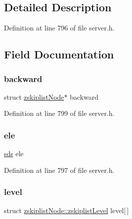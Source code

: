 \subsection{Detailed Description}


Definition at line 796 of file server.\+h.



\subsection{Field Documentation}
\mbox{\label{structzskiplist_node_a060155bb4ea50dabba713eac3451d80e}} 
\subsubsection{\texorpdfstring{backward}{backward}}
{\footnotesize\ttfamily struct \hyperlink{structzskiplist_node}{zskiplist\+Node}$\ast$ backward}



Definition at line 799 of file server.\+h.

\mbox{\label{structzskiplist_node_ac99cd495189c228ff8d538f04489805e}} 
\subsubsection{\texorpdfstring{ele}{ele}}
{\footnotesize\ttfamily \hyperlink{sds_8h_ad69abac3df4532879db9642c95f5ef6f}{sds} ele}



Definition at line 797 of file server.\+h.

\mbox{\label{structzskiplist_node_ab6e002b167ff0de655b16debe293180c}} 
\subsubsection{\texorpdfstring{level}{level}}
{\footnotesize\ttfamily struct \hyperlink{structzskiplist_node_1_1zskiplist_level}{zskiplist\+Node\+::zskiplist\+Level}  level\mbox{[}$\,$\mbox{]}}

